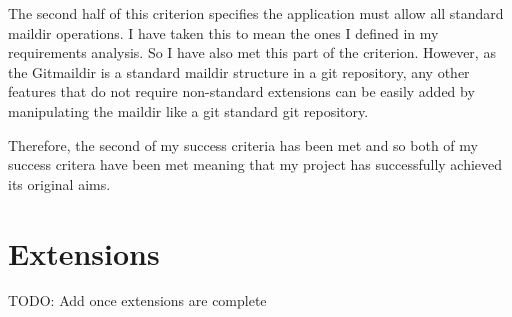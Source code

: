 The second half of this criterion specifies the application must allow all standard maildir operations. I have taken this to mean the ones I defined in my requirements analysis. So I have also met this part of the criterion. However, as the Gitmaildir is a standard maildir structure in a git repository, any other features that do not require non-standard extensions can be easily added by manipulating the maildir like a git standard git repository.

Therefore, the second of my success criteria has been met and so both of my success critera have been met meaning that my project has successfully achieved its original aims.

\section{Extensions}

TODO: Add once extensions are complete
